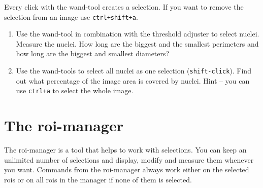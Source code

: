 Every click with the wand-tool creates a selection. If you want to remove the selection from an
image use \texttt{ctrl+shift+a}.

\begin{enumerate}
\item Use the wand-tool in combination with the threshold adjuster to select nuclei. Measure the nuclei. How long are the biggest and the smallest perimeters and how long are the biggest and smallest diameters?

\fbox{
	\begin{minipage}{\linewidth}
		\hfill\vspace{2cm}
	\end{minipage}
	}
	
\item Use the wand-tools to select all nuclei as one selection (\texttt{shift-click}). Find out what percentage of the image area is covered by nuclei. Hint – you can use \texttt{ctrl+a} to select the whole image.

\fbox{
	\begin{minipage}{\linewidth}
		\hfill\vspace{2cm}
	\end{minipage}
	}
	
\end{enumerate}

\section{The roi-manager}

The roi-manager is a tool that helps to work with selections. You can keep an unlimited number of
selections and display, modify and measure them whenever you want. Commands from the roi-manager always work either on the selected rois or on all rois in the manager if none of them is selected.

